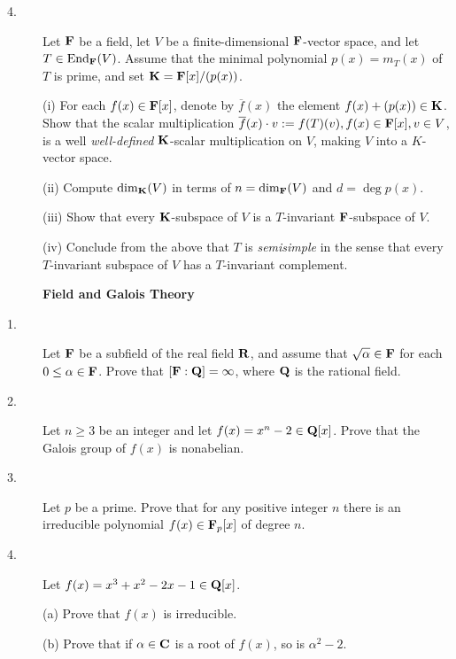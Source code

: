 \documentclass{article}
\begin{document}
\begin{description}
\item[4.]
Let ${\bf F}$ be a field, let $V$ be a finite-dimensional ${\bf F}$-vector
space, and let $T \in \hbox{End}_{\bf F} (V)$. Assume that the
minimal polynomial
$p(x) = m_T(x)$ of $T$ is prime, and set ${\bf K} = {\bf F}[x] / (p(x))$.

\item[\quad] (i)
For each $f(x) \in {\bf F}[x]$, denote by $\overline f (x)$ the element
$f(x) + (p(x)) \in {\bf K}$. Show that the scalar multiplication
$\overline f (x) \cdot v := f(T) (v), f(x) \in {\bf F}[x], v \in V$, is a well
{\it well-defined} ${\bf K}$-scalar multiplication on $V$, making $V$ into a
$K$-vector space.

\item[\quad] (ii)
Compute $\dim_{\bf K} (V)$ in terms of $n=\dim_{\bf F} (V)$ and
$d =\deg p(x)$.

\item[\quad] (iii)
Show that every ${\bf K}$-subspace of $V$ is a $T$-invariant ${\bf F}$-subspace of
$V$.

\item[\quad] (iv)
Conclude from the above that $T$ is {\it semisimple} in the sense that
every $T$-invariant subspace of $V$ has a $T$-invariant complement.

\centerline{{\bf Field and Galois Theory}}

\item[1.]
Let ${\bf F}$ be a subfield of the real field ${\bf R}$, and assume that
$\sqrt{\alpha} \in {\bf F}$ for each $0 \leq \alpha \in {\bf F}$. Prove that
$[{\bf F} : {\bf Q}] = \infty$, where ${\bf Q}$ is the rational field.

\item[2.]
Let $n \geq 3$ be an integer and let $f(x) = x^n - 2 \in {\bf Q} [x]$. Prove
that the Galois group of $f(x)$ is nonabelian.

\item[3.]
Let $p$ be a prime. Prove that for any positive integer $n$ there is an
irreducible polynomial $f(x) \in {\bf F}_p [x]$ of degree $n$.

\item[4.]
Let $f(x) = x^3 + x^2 - 2x - 1 \in {\bf Q} [x]$.

\item[\quad] (a)
Prove that $f(x)$ is irreducible.

\item[\quad] (b)
Prove that if $\alpha \in {\bf C}$ is a root of $f(x)$, so is $\alpha^2 - 2$.


\end{description}
\end{document}

